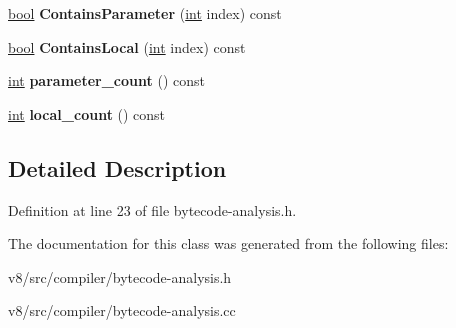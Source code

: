 \begin{DoxyCompactItemize}
\mbox{\hyperlink{classbool}{bool}} {\bfseries Contains\+Parameter} (\mbox{\hyperlink{classint}{int}} index) const
\item 
\mbox{\label{classv8_1_1internal_1_1compiler_1_1BytecodeLoopAssignments_ac6130bc8d8eb6b883e61295f9ca9e5da}} 
\mbox{\hyperlink{classbool}{bool}} {\bfseries Contains\+Local} (\mbox{\hyperlink{classint}{int}} index) const
\item 
\mbox{\label{classv8_1_1internal_1_1compiler_1_1BytecodeLoopAssignments_a54b4faec8bfcd7e45e7a232b4445a2b5}} 
\mbox{\hyperlink{classint}{int}} {\bfseries parameter\+\_\+count} () const
\item 
\mbox{\label{classv8_1_1internal_1_1compiler_1_1BytecodeLoopAssignments_a8b9068c7cf266075ae5eb6c366506f0d}} 
\mbox{\hyperlink{classint}{int}} {\bfseries local\+\_\+count} () const
\end{DoxyCompactItemize}


\subsection{Detailed Description}


Definition at line 23 of file bytecode-\/analysis.\+h.



The documentation for this class was generated from the following files\+:\begin{DoxyCompactItemize}
\item 
v8/src/compiler/bytecode-\/analysis.\+h\item 
v8/src/compiler/bytecode-\/analysis.\+cc\end{DoxyCompactItemize}
